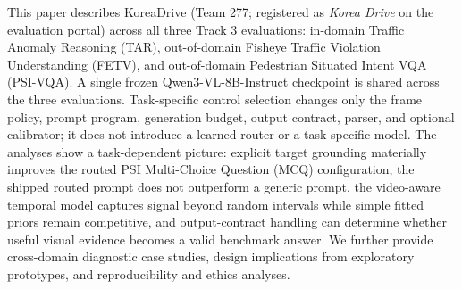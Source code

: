 \documentclass[runningheads]{llncs}
\newcommand{\tar}{TAR\xspace}
\newcommand{\fetv}{FETV\xspace}
\newcommand{\psivqa}{PSI-VQA\xspace}
\newcommand{\qwen}{Qwen3-VL-8B-\allowbreak Instruct\xspace}
\begin{document}
This paper describes KoreaDrive (Team 277; registered as \emph{Korea Drive} on the evaluation portal) across all three Track 3 evaluations: in-domain Traffic Anomaly Reasoning (\tar), out-of-domain Fisheye Traffic Violation Understanding (\fetv), and out-of-domain Pedestrian Situated Intent VQA (\psivqa). 
A single frozen \qwen checkpoint is shared across the three evaluations. Task-specific control selection changes only the frame policy, prompt program, generation budget, output contract, parser, and optional calibrator; it does not introduce a learned router or a task-specific model. %
The analyses show a task-dependent picture: explicit target grounding materially improves the routed PSI Multi-Choice Question (MCQ) configuration, the shipped routed prompt does not outperform a generic prompt, the video-aware temporal model captures signal beyond random intervals while simple fitted priors remain competitive, and output-contract handling can determine whether useful visual evidence becomes a valid benchmark answer. %
We further provide cross-domain diagnostic case studies, design implications from exploratory prototypes, and reproducibility and ethics analyses.
\end{document}
